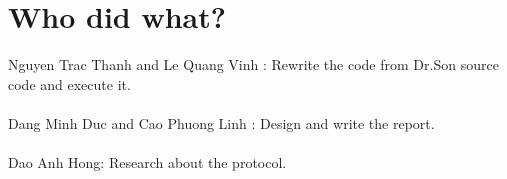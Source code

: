 \documentclass{article}
\begin{document}
\newpage
\section{Who did what?}

  Nguyen Trac Thanh and Le Quang Vinh : Rewrite the code from Dr.Son source code and execute it.
 \\
 \\
 Dang Minh Duc and Cao Phuong Linh : Design and write the report.
 \\ 
 \\
 Dao Anh Hong: Research about the protocol.
\end{document}
